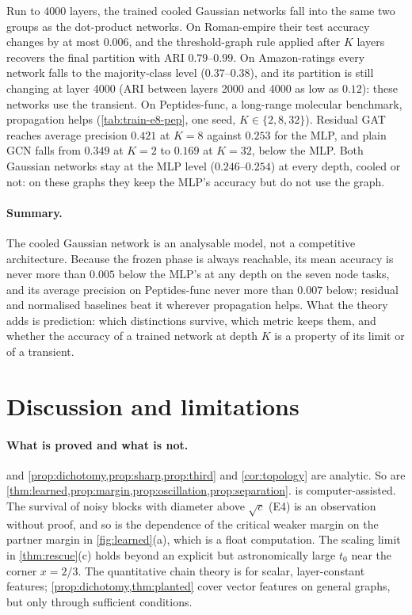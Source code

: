 \documentclass[10pt]{article}
\theoremstyle{definition}
\theoremstyle{remark}
\begin{document}
Run to 4000 layers, the trained cooled Gaussian networks fall into the same two groups as the dot-product networks. On Roman-empire their test
accuracy changes by at most $0.006$, and the threshold-graph rule applied after $K$ layers recovers the final partition with ARI
$0.79$--$0.99$. On Amazon-ratings every network falls to the majority-class level ($0.37$--$0.38$), and its partition is still changing at
layer 4000 (ARI between layers 2000 and 4000 as low as $0.12$): these networks use the transient.
On Peptides-func, a long-range molecular benchmark, propagation helps (\cref{tab:train-e8-pep}, one seed, $K\in\{2,8,32\}$). Residual GAT
reaches average precision $0.421$ at $K=8$ against $0.253$ for the MLP, and plain GCN falls from $0.349$ at $K=2$ to $0.169$ at $K=32$,
below the MLP. Both Gaussian networks stay at the MLP level ($0.246$--$0.254$) at every depth, cooled or not: on these graphs they keep the
MLP's accuracy but do not use the graph.

\paragraph{Summary.} The cooled Gaussian network is an analysable model, not a competitive architecture. Because the frozen phase is always
reachable, its mean accuracy is never more than $0.005$ below the MLP's at any depth on the seven node tasks, and its average precision on
Peptides-func never more than $0.007$ below; residual and normalised baselines beat
it wherever propagation helps. What the theory adds is prediction: which distinctions survive, which metric keeps them, and whether the
accuracy of a trained network at depth $K$ is a property of its limit or of a transient.

\section{Discussion and limitations}\label{sec:discussion}

\paragraph{What is proved and what is not.}  and
\cref{prop:dichotomy,prop:sharp,prop:third} and \cref{cor:topology} are analytic. So are \cref{thm:learned,prop:margin,prop:oscillation,prop:separation}.  is computer-assisted. The survival of
noisy blocks with diameter above $\sqrt c$ (E4) is an observation without proof, and so is the dependence of the critical weaker margin
on the partner margin in \cref{fig:learned}(a), which is a float computation. The scaling limit
in \cref{thm:rescue}(c) holds beyond an explicit but astronomically large $t_0$ near the corner $x=2/3$. The quantitative chain theory is
for scalar, layer-constant features; \cref{prop:dichotomy,thm:planted} cover vector features on general graphs, but only through
sufficient conditions.
\end{document}
